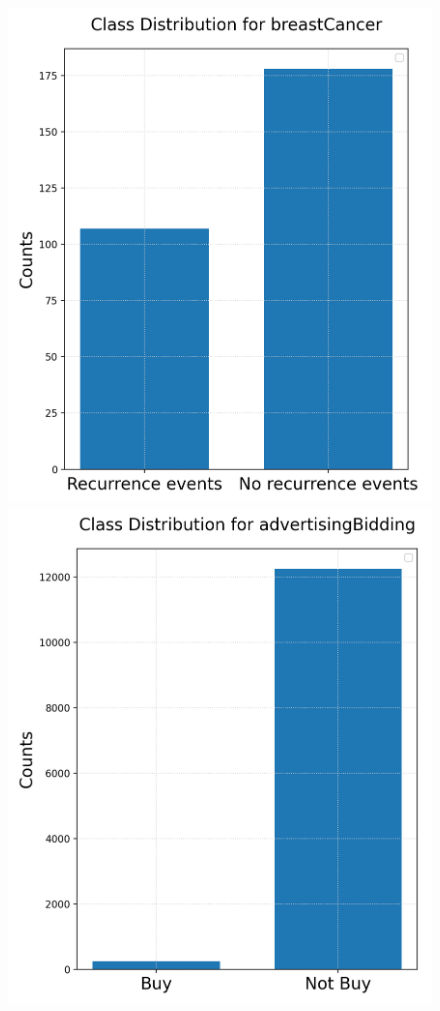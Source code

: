 \documentclass{article}
\begin{document}
\begin{figure}[h!]
	\begin{minipage}[b]{0.32\textwidth}
	\includegraphics[width=\textwidth]{Plots/Inbalance_breastCancer.png}
	\end{minipage}
	\begin{minipage}[b]{0.32\textwidth}
	\includegraphics[width=\textwidth]{Plots/Inbalance_advertisingBidding.png}

\end{minipage}
\end{figure}
\end{document}
